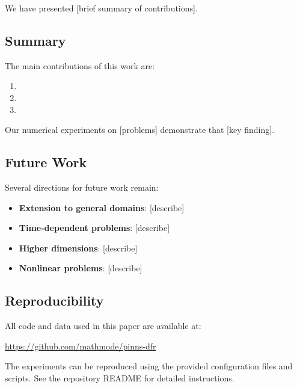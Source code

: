 
We have presented [brief summary of contributions].

\subsection{Summary}

The main contributions of this work are:
\begin{enumerate}
    \item [Contribution 1]
    \item [Contribution 2]
    \item [Contribution 3]
\end{enumerate}

Our numerical experiments on [problems] demonstrate that [key finding].

\subsection{Future Work}

Several directions for future work remain:

\begin{itemize}
    \item \textbf{Extension to general domains}: [describe]
    \item \textbf{Time-dependent problems}: [describe]
    \item \textbf{Higher dimensions}: [describe]
    \item \textbf{Nonlinear problems}: [describe]
\end{itemize}

\subsection{Reproducibility}

All code and data used in this paper are available at:
\begin{center}
    \url{https://github.com/mathmode/pinns-dfr}
\end{center}

The experiments can be reproduced using the provided configuration files and scripts. See the repository README for detailed instructions.
